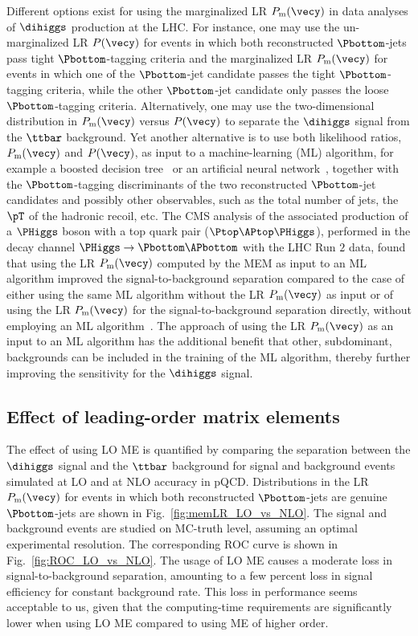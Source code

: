 Different options exist for using the marginalized LR $P_{\textrm{m}}(\vecy)$ in data analyses of $\dihiggs$ production at the LHC.
For instance, one may use the un-marginalized LR $P(\vecy)$ for events in which both reconstructed $\Pbottom$-jets pass tight $\Pbottom$-tagging criteria
and the marginalized LR $P_{\textrm{m}}(\vecy)$ for events in which one of the $\Pbottom$-jet candidate passes the tight $\Pbottom$-tagging criteria,
while the other $\Pbottom$-jet candidate only passes the loose $\Pbottom$-tagging criteria.
Alternatively, one may use the two-dimensional distribution in $P_{\textrm{m}}(\vecy)$ versus $P(\vecy)$ to separate the $\dihiggs$ signal from the $\ttbar$ background.
Yet another alternative is to use both likelihood ratios, $P_{\textrm{m}}(\vecy)$ and $P(\vecy)$,
as input to a machine-learning (ML) algorithm, for example a boosted decision tree~\cite{BDT} or an artificial neural network~\cite{ANN},
together with the $\Pbottom$-tagging discriminants of the two reconstructed $\Pbottom$-jet candidates and possibly other observables,
such as the total number of jets, the $\pT$ of the hadronic recoil, etc.
The CMS analysis of the associated production of a $\PHiggs$ boson with a top quark pair ($\Ptop\APtop\PHiggs$),
performed in the decay channel $\PHiggs \to \Pbottom\APbottom$ with the LHC Run $2$ data,
found that using the LR $P_{\textrm{m}}(\vecy)$ computed by the MEM as input to an ML algorithm
improved the signal-to-background separation compared to the case of either using the same ML algorithm without the LR $P_{\textrm{m}}(\vecy)$ as input
or of using the LR $P_{\textrm{m}}(\vecy)$ for the signal-to-background separation directly, without employing an ML algorithm~\cite{Sirunyan:2018mvw}.
The approach of using the LR $P_{\textrm{m}}(\vecy)$ as an input to an ML algorithm has the additional benefit
that other, subdominant, backgrounds can be included in the training of the ML algorithm, thereby further improving the sensitivity for the $\dihiggs$ signal.


\subsection{Effect of leading-order matrix elements}

The effect of using LO ME is quantified by comparing the separation between the $\dihiggs$ signal and the $\ttbar$ background
for signal and background events simulated at LO and at NLO accuracy in pQCD.
Distributions in the LR $P_{\textrm{m}}(\vecy)$ for events in which both reconstructed $\Pbottom$-jets are genuine $\Pbottom$-jets
are shown in Fig.~\ref{fig:memLR_LO_vs_NLO}.
The signal and background events are studied on MC-truth level, assuming an optimal experimental resolution.
The corresponding ROC curve is shown in Fig.~\ref{fig:ROC_LO_vs_NLO}.
The usage of LO ME causes a moderate loss in signal-to-background separation, 
amounting to a few percent loss in signal efficiency for constant background rate.
This loss in performance seems acceptable to us, given that the computing-time requirements are significantly lower when using LO ME
compared to using ME of higher order.

